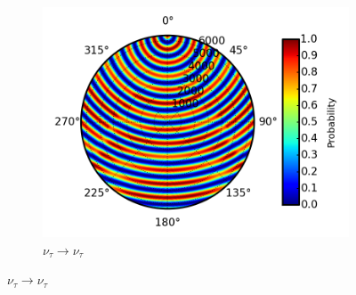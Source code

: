 \documentclass{beamer}
\begin{document}
\begin{frame}
\begin{figure}
\begin{subfigure}[b]{0.33\linewidth}
			\caption{ $\nu_{\tau} \rightarrow \nu_{\tau}$ }
			\includegraphics[width=\linewidth]{earth_1.0gev_nutau2nutau_throughEarth.png}
		\end{subfigure}
	\end{figure}
\end{frame}
\end{document}
